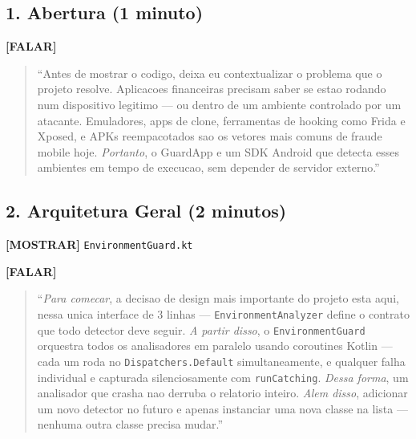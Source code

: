 \documentclass[12pt,a4paper]{article}
\begin{document}
\vspace{0.5cm}

\subsection*{1. Abertura (1 minuto)}

\textbf{[FALAR]}

\begin{quote}
``Antes de mostrar o codigo, deixa eu contextualizar o problema que o projeto resolve.
Aplicacoes financeiras precisam saber se estao rodando num dispositivo legitimo ---
ou dentro de um ambiente controlado por um atacante.
Emuladores, apps de clone, ferramentas de hooking como Frida e Xposed, e APKs
reempacotados sao os vetores mais comuns de fraude mobile hoje.
\textit{Portanto}, o GuardApp e um SDK Android que detecta esses ambientes
em tempo de execucao, sem depender de servidor externo.''
\end{quote}

\vspace{0.3cm}

\subsection*{2. Arquitetura Geral (2 minutos)}

\textbf{[MOSTRAR]} \texttt{EnvironmentGuard.kt}

\textbf{[FALAR]}

\begin{quote}
``\textit{Para comecar}, a decisao de design mais importante do projeto esta aqui,
nessa unica interface de 3 linhas ---
\texttt{EnvironmentAnalyzer} define o contrato que todo detector deve seguir.
\textit{A partir disso}, o \texttt{EnvironmentGuard} orquestra todos os analisadores
em paralelo usando coroutines Kotlin ---
cada um roda no \texttt{Dispatchers.Default} simultaneamente,
e qualquer falha individual e capturada silenciosamente com \texttt{runCatching}.
\textit{Dessa forma}, um analisador que crasha nao derruba o relatorio inteiro.
\textit{Alem disso}, adicionar um novo detector no futuro e apenas instanciar
uma nova classe na lista --- nenhuma outra classe precisa mudar.''
\end{quote}

\vspace{0.3cm}
\end{document}
